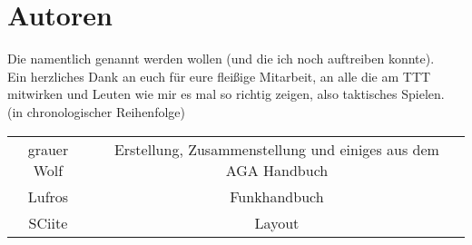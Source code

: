 \newpage
\section{Autoren}
Die namentlich genannt werden wollen (und die ich noch auftreiben konnte). \\
Ein herzliches Dank an euch für eure fleißige Mitarbeit, an alle die am TTT mitwirken und Leuten wie mir es mal so richtig zeigen, also taktisches Spielen. \\
(in chronologischer Reihenfolge) \\

\begin{tabular}{cc}
grauer Wolf  & Erstellung, Zusammenstellung und einiges aus dem AGA Handbuch \\
Lufros & Funkhandbuch \\
SCiite & Layout \\

\end{tabular}
